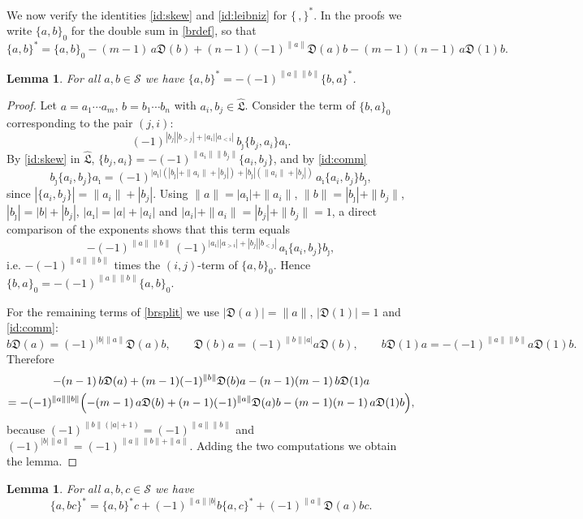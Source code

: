 \documentclass[11pt,reqno]{amsart}
\newcommand{\LL}{\mathfrak L}
\newcommand{\D}{\mathfrak D}
\newcommand{\Sm}{\mathcal S}
\newcommand{\Lh}{\widehat{\LL}}
\newcommand{\rp}[1]{\|#1\|}
\theoremstyle{plain}
\newtheorem{lemma}[theorem]{Lemma}
\theoremstyle{definition}
\theoremstyle{remark}
\begin{document}
We now verify the identities \eqref{id:skew} and \eqref{id:leibniz} for $\{\,,\}^*$.
In the proofs we write $\{a,b\}_0$ for the double sum in \eqref{brdef}, so that
\begin{equation}\label{brsplit}
\{a,b\}^*=\{a,b\}_0-(m-1)\,a\D(b)+(n-1)(-1)^{\rp a}\D(a)b-(m-1)(n-1)\,a\D(1)b .
\end{equation}

\begin{lemma}\label{lem:skew}
For all $a,b\in\Sm$ we have $\{a,b\}^*=-(-1)^{\rp a\rp b}\{b,a\}^*$.
\end{lemma}

\begin{proof}
Let $a=a_1\cdots a_m$, $b=b_1\cdots b_n$ with $a_i,b_j\in\Lh$.
Consider the term of $\{b,a\}_0$ corresponding to the pair $(j,i)$:
$$
(-1)^{|b_j||b_{>j}|+|a_i||a_{<i}|}\,b_{\hat\jmath}\{b_j,a_i\}a_{\hat\imath}.
$$
By \eqref{id:skew} in $\Lh$, $\{b_j,a_i\}=-(-1)^{\rp{a_i}\rp{b_j}}\{a_i,b_j\}$, and by \eqref{id:comm}
$$
b_{\hat\jmath}\{a_i,b_j\}a_{\hat\imath}=(-1)^{|a_{\hat\imath}|(|b_{\hat\jmath}|+\rp{a_i}+|b_j|)+|b_{\hat\jmath}|(\rp{a_i}+|b_j|)}\,a_{\hat\imath}\{a_i,b_j\}b_{\hat\jmath},
$$
since $|\{a_i,b_j\}|=\rp{a_i}+|b_j|$.
Using $\rp a=|a_{\hat\imath}|+\rp{a_i}$, $\rp b=|b_{\hat\jmath}|+\rp{b_j}$, $|b_{\hat\jmath}|=|b|+|b_j|$, $|a_{\hat\imath}|=|a|+|a_i|$ and $|a_i|+\rp{a_i}=|b_j|+\rp{b_j}=1$, a direct comparison of the exponents shows that this term equals
$$
-(-1)^{\rp a\rp b}\,(-1)^{|a_i||a_{>i}|+|b_j||b_{<j}|}\,a_{\hat\imath}\{a_i,b_j\}b_{\hat\jmath},
$$
i.e. $-(-1)^{\rp a\rp b}$ times the $(i,j)$-term of $\{a,b\}_0$.
Hence $\{b,a\}_0=-(-1)^{\rp a\rp b}\{a,b\}_0$.

For the remaining terms of \eqref{brsplit} we use $|\D(a)|=\rp a$, $|\D(1)|=1$ and \eqref{id:comm}:
$$
b\D(a)=(-1)^{|b|\rp a}\D(a)b,\qquad \D(b)a=(-1)^{\rp b|a|}a\D(b),\qquad b\D(1)a=-(-1)^{\rp a\rp b}a\D(1)b .
$$
Therefore
\begin{multline*}
-(n-1)\,b\D(a)+(m-1)(-1)^{\rp b}\D(b)a-(n-1)(m-1)\,b\D(1)a\\
=-(-1)^{\rp a\rp b}\Bigl(-(m-1)\,a\D(b)+(n-1)(-1)^{\rp a}\D(a)b-(m-1)(n-1)\,a\D(1)b\Bigr),
\end{multline*}
because $(-1)^{\rp b(|a|+1)}=(-1)^{\rp a\rp b}$ and $(-1)^{|b|\rp a}=(-1)^{\rp a\rp b+\rp a}$.
Adding the two computations we obtain the lemma.
\end{proof}

\begin{lemma}\label{lem:leibniz}
For all $a,b,c\in\Sm$ we have
$$
\{a,bc\}^*=\{a,b\}^*c+(-1)^{\rp a|b|}b\{a,c\}^*+(-1)^{\rp a}\D(a)bc .
$$
\end{lemma}
\end{document}
